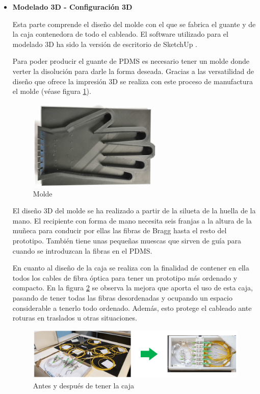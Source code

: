 \begin{itemize}
	

	\item \textbf{Modelado 3D - Configuración 3D}
	
	Esta parte comprende el diseño del molde con el que se fabrica el guante y de la caja contenedora de todo el cableado. El software utilizado para el modelado 3D ha sido la versión de escritorio de SketchUp \cite{SketchUp}.
	
	
	Para poder producir el guante de PDMS es necesario tener un molde donde verter la disolución para darle la forma deseada. Gracias a las versatilidad de diseño que ofrece la impresión 3D se realiza con este proceso de manufactura el molde (véase figura \ref{fig:molde}). 

	\begin{figure}[H]
		\centering
		\includegraphics[width=0.6\textwidth]{./img/molde}
		\caption{Molde} \label{fig:molde}
	\end{figure}
 
 	El diseño 3D del molde se ha realizado a partir de la silueta de la huella de la mano. El recipiente con forma de mano necesita seis franjas a la altura de la muñeca para conducir por ellas las fibras de Bragg hasta el resto del prototipo. También tiene unas pequeñas muescas que sirven de guía para cuando se introduzcan la fibras en el PDMS.
 	 	
 	 	
 	En cuanto al diseño de la caja se realiza con la finalidad de contener en ella todos los cables de fibra óptica para tener un prototipo más ordenado y compacto. En la figura \ref{fig:ordenCaja} se observa la mejora que aporta el uso de esta caja, pasando de tener todas las fibras desordenadas y ocupando un espacio considerable a tenerlo todo ordenado. Además, esto protege el cableado ante roturas en traslados u otras situaciones. 
 	
	\begin{figure}[H]
	 	\centering
	 	\includegraphics[width=1\textwidth]{./img/ordenCaja}
	 	\caption{Antes y después de tener la caja} \label{fig:ordenCaja}
	\end{figure}





\end{itemize}
